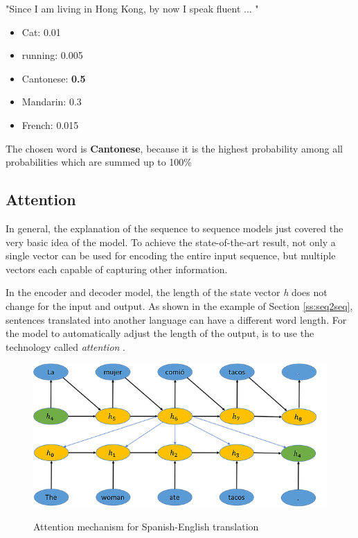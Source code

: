 \begin{tcolorbox}
	"Since I am living in Hong Kong, by now I speak fluent ... "
	
	\begin{itemize}
		\item Cat: 0.01
		\item running: 0.005
		\item Cantonese: \textbf{0.5}
		\item Mandarin: 0.3
		\item French: 0.015
	\end{itemize}

	The chosen word is \textbf{Cantonese}, because it is the highest probability among all probabilities which are summed up to 100\%
\end{tcolorbox}
 

\subsection{Attention}
In general, the explanation of the sequence to sequence models just covered the very basic idea of the model. To achieve the state-of-the-art result, not only a single vector can be used for encoding the entire input sequence, but multiple vectors each capable of capturing other information. 


In the encoder and decoder model, the length of the state vector \textit{h} does not change for the input and output. As shown in the example of Section \ref{ss:seq2seq}, sentences translated into another language can have a different word length. For the model to automatically adjust the length of the output, is to use the technology called \textit{attention} \cite{attention} \cite{attention2}.

\begin{figure}
	\begin{center}
		\includegraphics[width=4.5in]{photos/w1-11}\\
		\caption{Attention mechanism for Spanish-English translation \cite{mugan}}\label{attention1}
	\end{center}
\end{figure}

